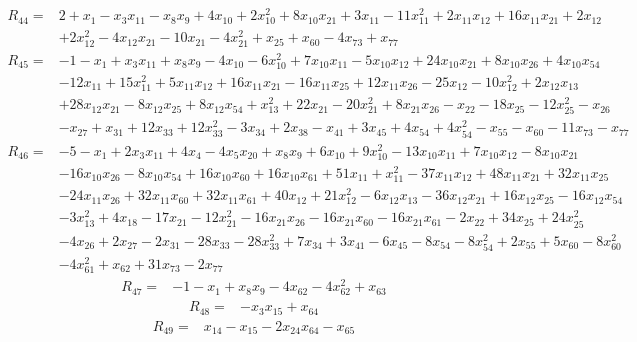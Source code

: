\begin{align*}
 R_{44}={}&2 +x_{1} -x_{3}x_{11} -x_{8}x_{9} +4x_{10} +2x_{10}^{2} +8x_{10}x_{21} +3x_{11} -11x_{11}^{2} +2x_{11}x_{12} +16x_{11}x_{21} +2x_{12}\\
 &+2x_{12}^{2} -4x_{12}x_{21} -10x_{21} -4x_{21}^{2} +x_{25} +x_{60} -4x_{73} +x_{77}
\end{align*}
\begin{align*}
 R_{45}={}&-1 -x_{1} +x_{3}x_{11} +x_{8}x_{9} -4x_{10} -6x_{10}^{2} +7x_{10}x_{11} -5x_{10}x_{12} +24x_{10}x_{21} +8x_{10}x_{26} +4x_{10}x_{54}\\
 &-12x_{11} +15x_{11}^{2} +5x_{11}x_{12} +16x_{11}x_{21} -16x_{11}x_{25} +12x_{11}x_{26} -25x_{12} -10x_{12}^{2} +2x_{12}x_{13}\\
 &+28x_{12}x_{21} -8x_{12}x_{25} +8x_{12}x_{54} +x_{13}^{2} +22x_{21} -20x_{21}^{2} +8x_{21}x_{26} -x_{22} -18x_{25} -12x_{25}^{2} -x_{26}\\
 &-x_{27} +x_{31} +12x_{33} +12x_{33}^{2} -3x_{34} +2x_{38} -x_{41} +3x_{45} +4x_{54} +4x_{54}^{2} -x_{55} -x_{60} -11x_{73} -x_{77}
\end{align*}
\begin{align*}
 R_{46}={}&-5 -x_{1} +2x_{3}x_{11} +4x_{4} -4x_{5}x_{20} +x_{8}x_{9} +6x_{10} +9x_{10}^{2} -13x_{10}x_{11} +7x_{10}x_{12} -8x_{10}x_{21}\\
 &-16x_{10}x_{26} -8x_{10}x_{54} +16x_{10}x_{60} +16x_{10}x_{61} +51x_{11} +x_{11}^{2} -37x_{11}x_{12} +48x_{11}x_{21} +32x_{11}x_{25}\\
 &-24x_{11}x_{26} +32x_{11}x_{60} +32x_{11}x_{61} +40x_{12} +21x_{12}^{2} -6x_{12}x_{13} -36x_{12}x_{21} +16x_{12}x_{25} -16x_{12}x_{54}\\
 &-3x_{13}^{2} +4x_{18} -17x_{21} -12x_{21}^{2} -16x_{21}x_{26} -16x_{21}x_{60} -16x_{21}x_{61} -2x_{22} +34x_{25} +24x_{25}^{2}\\
 &-4x_{26} +2x_{27} -2x_{31} -28x_{33} -28x_{33}^{2} +7x_{34} +3x_{41} -6x_{45} -8x_{54} -8x_{54}^{2} +2x_{55} +5x_{60} -8x_{60}^{2}\\
 &-4x_{61}^{2} +x_{62} +31x_{73} -2x_{77}
\end{align*}
\begin{align*}
 R_{47}={}&-1 -x_{1} +x_{8}x_{9} -4x_{62} -4x_{62}^{2} +x_{63}
\end{align*}
\begin{align*}
 R_{48}={}&-x_{3}x_{15} +x_{64}
\end{align*}
\begin{align*}
 R_{49}={}&x_{14} -x_{15} -2x_{24}x_{64} -x_{65}
\end{align*}
